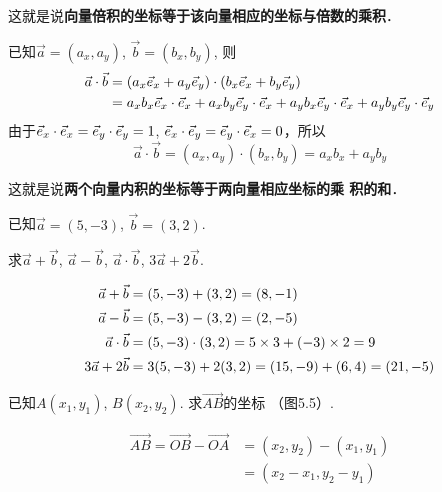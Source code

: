 这就是说\textbf{向量倍积的坐标等于该向量相应的坐标与倍数的乘积}．

已知$\vec{a}=(a_x,a_y)$, $\vec{b}=(b_x,b_y)$, 则
\[\begin{split}
    \vec{a}\cdot \vec{b}&=(a_x\vec{e}_x+a_y\vec{e}_y)\cdot (b_x\vec{e}_x+b_y\vec{e}_y)\\
    &=a_xb_x\vec{e}_x\cdot \vec{e}_x+a_xb_y\vec{e}_y\cdot \vec{e}_x+a_yb_x\vec{e}_y\cdot \vec{e}_x+a_yb_y\vec{e}_y\cdot \vec{e}_y
\end{split}\]
由于$\vec{e}_x\cdot \vec{e}_x=\vec{e}_y\cdot \vec{e}_y=1$, $\vec{e}_x\cdot \vec{e}_y=\vec{e}_y\cdot \vec{e}_x=0$，所以
\[\vec{a}\cdot \vec{b}=(a_x,a_y)\cdot (b_x,b_y)=a_xb_x+a_yb_y\]

这就是说\textbf{两个向量内积的坐标等于两向量相应坐标的乘
积的和}．

\begin{example}
    已知$\vec{a}=(5,-3)$, $\vec{b}=(3,2)$.

求$\vec{a}+\vec{b}$, $\vec{a}-\vec{b}$, $\vec{a}\cdot \vec{b}$, $3\vec{a}+2\vec{b}$.
\end{example}

\begin{solution}
\[\begin{split}
    \vec{a}+\vec{b}&=(5,-3)+(3,2)=(8,-1)\\
    \vec{a}-\vec{b}&=(5,-3)-(3,2)=(2,-5)\\
    \vec{a}\cdot \vec{b}&=(5,-3)\cdot (3,2)=5\times 3+(-3)\times2=9\\
    3\vec{a}+2\vec{b}&=3(5,-3)+2(3,2)=(15,-9)+(6,4)=(21,-5)
\end{split}\]
\end{solution}

\begin{example}
    已知$A(x_1,y_1)$, $B(x_2,y_2)$. 求$\Vec{AB}$的坐标
（图5.5）.
\end{example}

\begin{figure}[htp]
    \centering
{}
    \caption{}
\end{figure}


\begin{solution}
\[\begin{split}
    \Vec{AB}=\Vec{OB}-\Vec{OA}&=(x_2,y_2)-(x_1,y_1)\\
    &=(x_2-x_1,y_2-y_1)
\end{split}\]
\end{solution}

